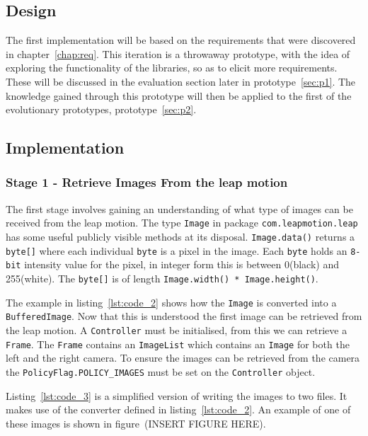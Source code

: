 \documentclass[11pt,oneside]{report}
\newcommand\code[1]{\texttt{#1}}
\begin{document}
		\subsection{Design}
		The first implementation will be based on the requirements that were discovered in chapter~\ref{chap:req}.
		This iteration is a throwaway prototype, with the idea of exploring the functionality of the libraries, so as to elicit more requirements.
		These will be discussed in the evaluation section later in prototype~\ref{sec:p1}.
		The knowledge gained through this prototype will then be applied to the first of the evolutionary prototypes, prototype~\ref{sec:p2}.
		\subsection{Implementation}
		\subsubsection{Stage 1 - Retrieve Images From the leap motion}
		The first stage involves gaining an understanding of what type of images can be received from the leap motion.
		The type \code{Image} in package \code{com.leapmotion.leap} has some useful publicly visible methods at its disposal.
		\code{Image.data()} returns a \code{byte[]} where each individual \code{byte} is a pixel in the image.
		Each \code{byte} holds an \code{8-bit} intensity value for the pixel, in integer form this is between 0(black) and 255(white).
		The \code{byte[]} is of length \code{Image.width() * Image.height()}.
		
		The example in listing~\ref{lst:code_2} shows how the \code{Image} is converted into a \code{BufferedImage}.
		Now that this is understood the first image can be retrieved from the leap motion.
		A \code{Controller} must be initialised, from this we can retrieve a \code{Frame}.
		The \code{Frame} contains an \code{ImageList} which contains an \code{Image} for both the left and the right camera.
		To ensure the images can be retrieved from the camera the \code{PolicyFlag.POLICY\_IMAGES} must be set on the \code{Controller} object.
		
		Listing~\ref{lst:code_3} is a simplified version of writing the images to two files.
		It makes use of the converter defined in listing~\ref{lst:code_2}.
		An example of one of these images is shown in figure~(INSERT FIGURE HERE). %
			
			
\end{document}
